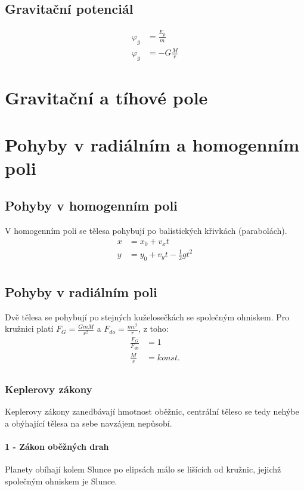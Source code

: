 \documentclass[titlepage]{report}
\begin{document}
\subsection{Gravitační potenciál}
\begin{align}
\varphi _g &= \frac{E_p}{m}\\
\varphi _g &= -G\frac{M}{r}
\end{align}
\section{Gravitační a tíhové pole}
\section{Pohyby v radiálním a homogenním poli}
\subsection{Pohyby v homogenním poli}
V homogenním poli se tělesa pohybují po balistických křivkách (parabolách).\\
\begin{align}
x &= x_0 + v_x t\\
y &= y_0 + v_y t - \frac{1}{2} g t^2\\
\end{align}
\subsection{Pohyby v radiálním poli}
Dvě tělesa se pohybují po stejných kuželosečkách se společným ohniskem. Pro kružnici platí $F_G = \frac{GmM}{r^2}$ a $F_{do} = \frac{mv^2}{r}$, z toho:\\
\begin{align}
\frac{F_G}{F_{do}} &= 1\\
\frac{M}{r} &= konst.\\
\end{align}
\subsubsection{Keplerovy zákony}
Keplerovy zákony zanedbávají hmotnost oběžnic, centrální těleso se tedy nehýbe a obýhající tělesa na sebe navzájem nepůsobí.
\paragraph{1 - Zákon oběžných drah}
Planety obíhají kolem Slunce po elipsách málo se lišících od kružnic, jejichž společným ohniskem je Slunce.
\end{document}
